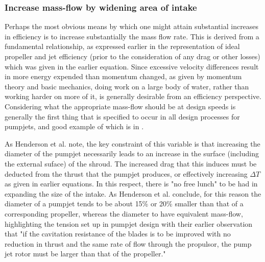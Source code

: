 \documentclass{article}\usepackage[]{graphicx}\usepackage[]{color}
\begin{document}
\subsubsection{Increase mass-flow by widening area of intake}
Perhaps the most obvious means by which one might attain substantial increases in efficiency is to increase substantially the mass flow rate.  This is derived from a fundamental relationship, as expressed earlier in the representation of ideal propeller and jet efficiency (prior to the consideration of any drag or other losses) which was given in the earlier equation.  Since excessive velocity differences result in more energy expended than momentum changed, as given by momentum theory and basic mechanics, doing work on a large body of water, rather than working harder on more of it, is generally desirable from an efficiency perspective.  Considering what the appropriate mass-flow should be at design speeds is generally the first thing that is specified to occur in all design processes for pumpjets, and good example of which is in \cite[6-7]{henderson1964}.

As Henderson et al. note, the key constraint of this variable is that increasing the diameter of the pumpjet necessarily leads to an increase in the surface (including the external suface) of the shroud.  The increased drag that this induces must be deducted from the thrust that the pumpjet produces, or effectively increasing $\Delta T$ as given in earlier equations.  In this respect, there is "no free lunch" to be had in expanding the size of the intake.  As Henderson et al. conclude, for this reason the diameter of a pumpjet tends to be about 15\% or 20\% smaller than that of a corresponding propeller, whereas the diameter to have equivalent mass-flow, highlighting the tension set up in pumpjet design with their earlier observation that "if the cavitation resistance of the blades is to be improved with no reduction in thrust and the same rate of flow through the propulsor, the pump jet rotor must be larger than that of the propeller." \parencite[1]{henderson1964}
\end{document}
